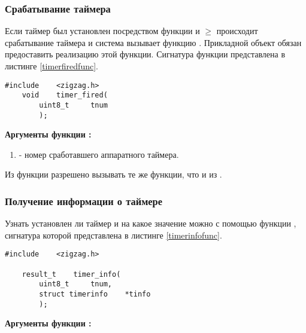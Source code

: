 \subsubsection{Срабатывание таймера}

Если таймер был установлен посредством функции  и $\geq$
происходит срабатывание таймера и система вызывает функцию . Прикладной объект обязан
предоставить реализацию этой функции. Сигнатура функции  представлена в листинге \ref{timerfiredfunc}.

\begin{lstlisting}[caption=Функция \myfunc{timer\_fired()} - срабатывание таймера., label=timerfiredfunc ]
    #include    <zigzag.h>
    void    timer_fired(
        uint8_t     tnum
        );
\end{lstlisting}

{\bfseries Аргументы функции :}

{\itshape
\begin{enumerate}
\item {} - номер сработавшего аппаратного таймера.
\end{enumerate}
}

Из функции  разрешено вызывать те же функции, что и из .

\subsubsection{Получение информации о таймере}

Узнать установлен ли таймер и на какое значение  можно с помощью функции , сигнатура
которой представлена в листинге \ref{timerinfofunc}.

\begin{lstlisting}[caption=\myfunc{timer\_info()} - информация о таймере, label=timerinfofunc ]
    #include    <zigzag.h>

    result_t    timer_info(
        uint8_t     tnum,
        struct timerinfo    *tinfo
        );
\end{lstlisting}

{\bfseries Аргументы функции :}

